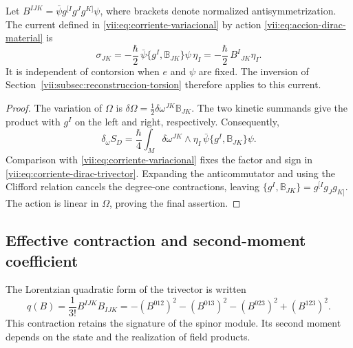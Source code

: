 \begin{proposition}
\label{vii:prop:corriente-dirac-explicita}
Let
\(B^{IJK}=\bar\psi g^{[I}g^Jg^{K]}\psi\), where brackets
denote normalized antisymmetrization. The current defined in
\eqref{vii:eq:corriente-variacional} by action
\eqref{vii:eq:accion-dirac-material} is
\begin{equation}
 \sigma_{JK}
 =-\frac{\hbar}{2}\,
   \bar\psi\{g^I,\mathbb B_{JK}\}\psi\,\eta_I
 =-\frac{\hbar}{2}\,B^I{}_{JK}\eta_I.
 \label{vii:eq:corriente-dirac-trivector}
\end{equation}
It is independent of contorsion when \(e\) and \(\psi\) are
fixed. The inversion of Section~\ref{vii:subsec:reconstruccion-torsion}
therefore applies to this current.
\end{proposition}
\begin{proof}
The variation of \(\Omega\) is
\(\delta\Omega=\frac12\delta\omega^{JK}\mathbb B_{JK}\).
The two kinetic summands give the product with
\(g^I\) on the left and right, respectively. Consequently,
\[
 \delta_\omega S_D
 =\frac{\hbar}{4}\int_M\delta\omega^{JK}\wedge\eta_I\,
                 \bar\psi\{g^I,\mathbb B_{JK}\}\psi.
\]
Comparison with \eqref{vii:eq:corriente-variacional} fixes the
factor and sign in \eqref{vii:eq:corriente-dirac-trivector}.
Expanding the anticommutator and using the Clifford relation cancels
the degree-one contractions, leaving
\(\{g^I,\mathbb B_{JK}\}=g^{[I}g_Jg_{K]}\).
The action is linear in \(\Omega\), proving the final assertion.
\end{proof}

\subsection{Effective contraction and second-moment coefficient}
\label{vii:subsec:contraccion-espinorial}

The Lorentzian quadratic form of the trivector is written
\begin{equation}
 q(B)=\frac1{3!}B^{IJK}B_{IJK}
 =-(B^{012})^2-(B^{013})^2-(B^{023})^2+(B^{123})^2.
 \label{vii:eq:cuadratica-trivector}
\end{equation}
This contraction retains the signature of the spinor module. Its
second moment depends on the state and the realization of field products.

